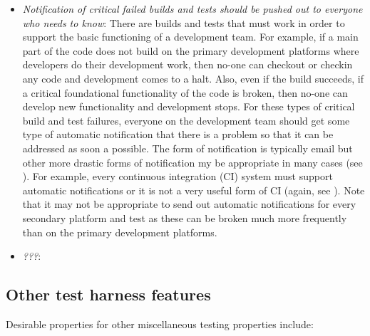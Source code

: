 \documentclass[pdf,ps2pdf,11pt]{SANDreport}
\begin{document}
\begin{itemize}
{}\item\textit{Notification of critical failed builds and tests should
be pushed out to everyone who needs to know}: There are builds and
tests that must work in order to support the basic functioning of a
development team.  For example, if a main part of the code does not
build on the primary development platforms where developers do their
development work, then no-one can checkout or checkin any code and
development comes to a halt.  Also, even if the build succeeds, if a
critical foundational functionality of the code is broken, then no-one
can develop new functionality and development stops.  For these types
of critical build and test failures, everyone on the development team
should get some type of automatic notification that there is a problem
so that it can be addressed as soon a possible.  The form of
notification is typically email but other more drastic forms of
notification my be appropriate in many cases (see {}\cite[Chapter
9]{book:continuous-integration}).  For example, every continuous
integration (CI) system must support automatic notifications or it is
not a very useful form of CI (again, see
{}\cite{book:continuous-integration}).  Note that it may not be
appropriate to send out automatic notifications for every secondary
platform and test as these can be broken much more frequently than on
the primary development platforms.
  
{}\item\textit{???}:

\end{itemize}

%
\subsection{Other test harness features}
%

Desirable properties for other miscellaneous testing properties
include:
\end{document}
